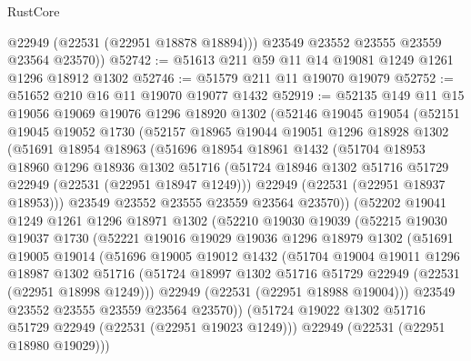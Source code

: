 \begin{lexlean}{RustCore}
\begin{coremodule}
          @22949
          (@22531 (@22951 @18878 @18894)))
        @23549
        @23552
        @23555
        @23559
        @23564
        @23570))
@52742 := @51613 @211 @59 @11 @14 @19081 @1249 @1261 @1296 @18912 @1302
@52746 := @51579 @211 @11 @19070 @19079
@52752 := @51652 @210 @16 @11 @19070 @19077 @1432
@52919 := @52135
    @149
    @11
    @15
    @19056
    @19069
    @19076
    @1296
    @18920
    @1302
    (@52146
      @19045
      @19054
      (@52151
        @19045
        @19052
        @1730
        (@52157
          @18965
          @19044
          @19051
          @1296
          @18928
          @1302
          (@51691
            @18954
            @18963
            (@51696
              @18954
              @18961
              @1432
              (@51704
                @18953
                @18960
                @1296
                @18936
                @1302
                @51716
                (@51724 @18946 @1302 @51716 @51729 @22949 (@22531 (@22951 @18947 @1249)))
                @22949
                (@22531 (@22951 @18937 @18953)))
              @23549
              @23552
              @23555
              @23559
              @23564
              @23570))
          (@52202
            @19041
            @1249
            @1261
            @1296
            @18971
            @1302
            (@52210
              @19030
              @19039
              (@52215
                @19030
                @19037
                @1730
                (@52221
                  @19016
                  @19029
                  @19036
                  @1296
                  @18979
                  @1302
                  (@51691
                    @19005
                    @19014
                    (@51696
                      @19005
                      @19012
                      @1432
                      (@51704
                        @19004
                        @19011
                        @1296
                        @18987
                        @1302
                        @51716
                        (@51724 @18997 @1302 @51716 @51729 @22949 (@22531 (@22951 @18998 @1249)))
                        @22949
                        (@22531 (@22951 @18988 @19004)))
                      @23549
                      @23552
                      @23555
                      @23559
                      @23564
                      @23570))
                  (@51724 @19022 @1302 @51716 @51729 @22949 (@22531 (@22951 @19023 @1249)))
                  @22949
                  (@22531 (@22951 @18980 @19029)))

\end{coremodule}
\end{lexlean}
